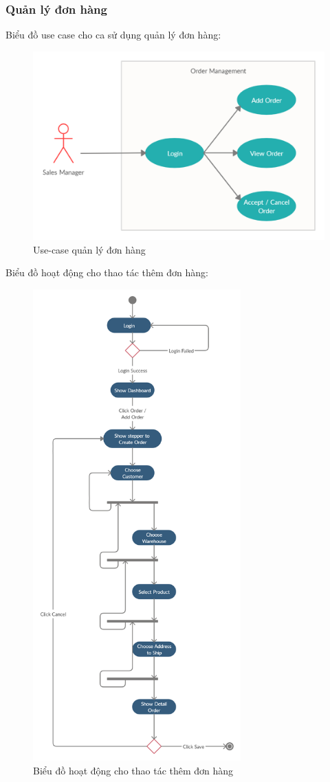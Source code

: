 \subsubsection{Quản lý đơn hàng}
Biểu đồ use case cho ca sử dụng quản lý đơn hàng:
\begin{figure}[H]
\centering
\includegraphics[width=14cm]{images/use-case/order.png}
\caption{Use-case quản lý đơn hàng}
\end{figure}

Biểu đồ hoạt động cho thao tác thêm đơn hàng:
\begin{figure}[H]
\centering
\includegraphics[width=8cm]{images/activity-diagram/add-order.png}
\caption{Biểu đồ hoạt động cho thao tác thêm đơn hàng}
\end{figure}

